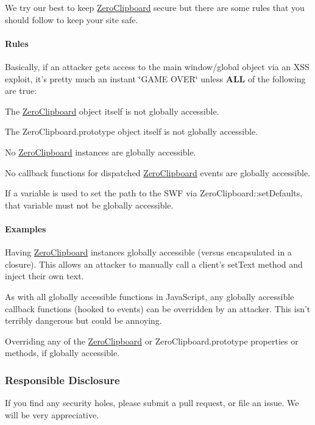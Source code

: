 We try our best to keep \hyperlink{class_zero_clipboard}{Zero\-Clipboard} secure but there are some rules that you should follow to keep your site safe.

\paragraph*{Rules}

Basically, if an attacker gets access to the main window/global object via an X\-S\-S exploit, it's pretty much an instant \char`\"{}\-G\-A\-M\-E O\-V\-E\-R\char`\"{} unless {\bfseries A\-L\-L} of the following are true\-:
\begin{DoxyEnumerate}
\item The {\ttfamily \hyperlink{class_zero_clipboard}{Zero\-Clipboard}} object itself is not globally accessible.
\item The {\ttfamily Zero\-Clipboard.\-prototype} object itself is not globally accessible.
\item No {\ttfamily \hyperlink{class_zero_clipboard}{Zero\-Clipboard}} instances are globally accessible.
\item No callback functions for dispatched \hyperlink{class_zero_clipboard}{Zero\-Clipboard} events are globally accessible.
\item If a variable is used to set the path to the S\-W\-F via {\ttfamily Zero\-Clipboard\-::set\-Defaults}, that variable must not be globally accessible.
\end{DoxyEnumerate}

\paragraph*{Examples}


\begin{DoxyEnumerate}
\item Having {\ttfamily \hyperlink{class_zero_clipboard}{Zero\-Clipboard}} instances globally accessible (versus encapsulated in a closure). This allows an attacker to manually call a client's {\ttfamily set\-Text} method and inject their own text.
\item As with all globally accessible functions in Java\-Script, any globally accessible callback functions (hooked to events) can be overridden by an attacker. This isn't terribly dangerous but could be annoying.
\item Overriding any of the {\ttfamily \hyperlink{class_zero_clipboard}{Zero\-Clipboard}} or {\ttfamily Zero\-Clipboard.\-prototype} properties or methods, if globally accessible.
\end{DoxyEnumerate}

\subsubsection*{Responsible Disclosure}

If you find any security holes, please submit a pull request, or file an issue. We will be very appreciative. 